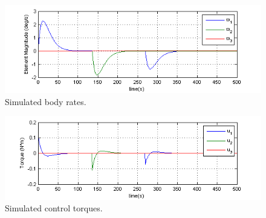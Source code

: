 \documentclass[paper]{aiaaNew}
\begin{document}
 \begin{figure}[htb]
 	\centering
 	\includegraphics[]{Figures/NominalRates}
 	\caption{Simulated body rates.}
 	\label{fig:NominalRates}
 \end{figure}
 \begin{figure}[htb]
 	\centering
 	\includegraphics[]{Figures/NominalU}
 	\caption{Simulated control torques.}
 	\label{fig:NominalU}
 \end{figure}
\par
\end{document}
